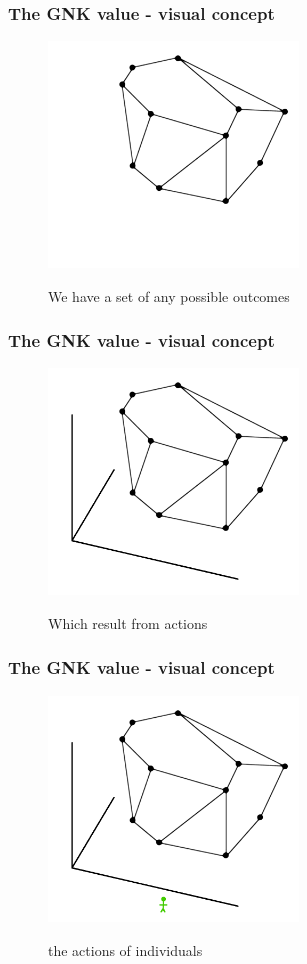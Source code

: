 \begin{frame} \frametitle{The GNK value - visual concept} \begin{figure} \begin{center} \includegraphics[height=6cm]{figs/pp1} \end{center} We have a set of any possible outcomes \end{figure} \end{frame}
\begin{frame} \frametitle{The GNK value - visual concept} \begin{figure} \begin{center} \includegraphics[height=6cm]{figs/pp2} \end{center} Which result from actions \end{figure} \end{frame}
\begin{frame} \frametitle{The GNK value - visual concept} \begin{figure} \begin{center} \includegraphics[height=6cm]{figs/pp3} \end{center} the actions of individuals \end{figure} \end{frame}
